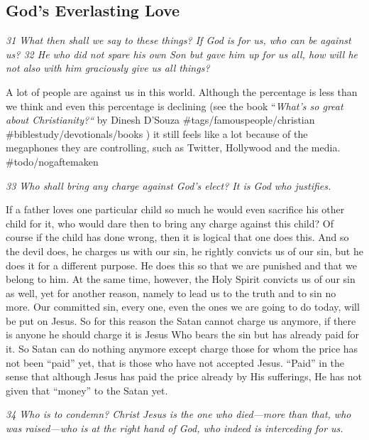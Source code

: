 \subsection{God's Everlasting Love} \emph{31 What then shall we say to these
things? If God is for us, who can be against us? 32 He who did not spare
his own Son but gave him up for us all, how will he not also with him
graciously give us all things?}

A lot of people are against us in this world. Although the percentage is
less than we think and even this percentage is declining (see the book
``\emph{What's so great about Christianity?{}``} by Dinesh D'Souza
\#tags/famouspeople/christian \#biblestudy/devotionals/books ) it still
feels like a lot because of the megaphones they are controlling, such as
Twitter, Hollywood and the media. \#todo/nogaftemaken

\emph{33 Who shall bring any charge against God's elect? It is God who
justifies.}

If a father loves one particular child so much he would even sacrifice
his other child for it, who would dare then to bring any charge against
this child? Of course if the child has done wrong, then it is logical
that one does this. And so the devil does, he charges us with our sin,
he rightly convicts us of our sin, but he does it for a different
purpose. He does this so that we are punished and that we belong to him.
At the same time, however, the Holy Spirit convicts us of our sin as
well, yet for another reason, namely to lead us to the truth and to sin
no more. Our committed sin, every one, even the ones we are going to do
today, will be put on Jesus. So for this reason the Satan cannot charge
us anymore, if there is anyone he should charge it is Jesus Who bears
the sin but has already paid for it. So Satan can do nothing anymore
except charge those for whom the price has not been ``paid'' yet, that
is those who have not accepted Jesus. ``Paid'' in the sense that
although Jesus has paid the price already by His sufferings, He has not
given that ``money'' to the Satan yet.

\emph{34 Who is to condemn? Christ Jesus is the one who died---more than
that, who was raised---who is at the right hand of God, who indeed is
interceding for us.}

